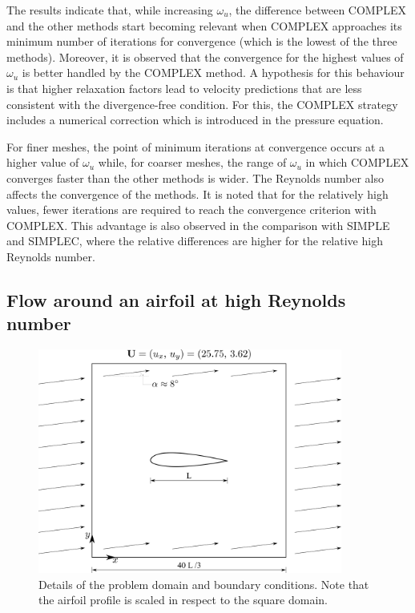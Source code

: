\documentclass[final,3p,times,11pt,onecolumn]{myElsarticle}
\numberwithin{equation}{section}
\begin{document}
The results indicate that, while increasing $\omega_u$, the difference between COMPLEX and the other methods start becoming relevant when COMPLEX approaches  its minimum number of iterations for convergence (which is the lowest of the three methods). Moreover, it is observed that the convergence for the highest values of $\omega_u$ is better handled by the COMPLEX method. A hypothesis for this behaviour is that higher relaxation factors lead to velocity predictions that are less consistent with the divergence-free condition. For this, the COMPLEX strategy includes a numerical correction which is introduced in the pressure equation.


For finer meshes, the point of minimum iterations at convergence occurs at a higher value of $\omega_u$ while, for coarser meshes, the range of $\omega_u$ in which COMPLEX converges faster than the other methods is wider. The Reynolds number also affects the convergence of the methods. It is noted that for the relatively high values, fewer iterations are required to reach the convergence criterion with COMPLEX. This advantage is also observed in the comparison with SIMPLE and SIMPLEC, where the relative differences are higher for the relative high Reynolds number.


\subsection{Flow around an airfoil at high Reynolds number}
\begin{figure}[t!]
\centering
\includegraphics[width=10cm]{fig/Turbulence/Esquema.pdf}
\caption{Details of the problem domain and boundary conditions. Note that the airfoil profile is scaled in respect to the square domain.}
\label{Fig:Esquema}
\end{figure}
\end{document}
